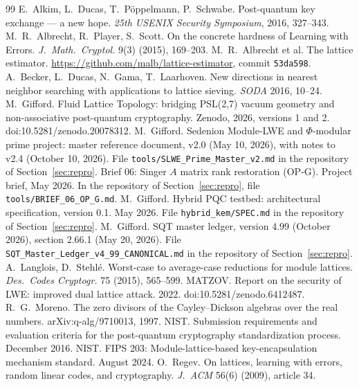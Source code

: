 \documentclass[11pt]{article}
\theoremstyle{remark}
\begin{document}
\begin{thebibliography}{99}\small
{} E.~Alkim, L.~Ducas, T.~P\"oppelmann, P.~Schwabe. Post-quantum key exchange --- a new hope.
  \emph{25th USENIX Security Symposium}, 2016, 327--343.
 M.~R.~Albrecht, R.~Player, S.~Scott. On the concrete hardness of Learning with Errors.
  \emph{J.\ Math.\ Cryptol.} 9(3) (2015), 169--203.
 M.~R.~Albrecht et al. The lattice estimator.
  \url{https://github.com/malb/lattice-estimator}, commit \texttt{53da598}.
 A.~Becker, L.~Ducas, N.~Gama, T.~Laarhoven. New directions in nearest neighbor searching with
  applications to lattice sieving. \emph{SODA} 2016, 10--24.
 M.~Gifford. Fluid Lattice Topology: bridging PSL(2,7) vacuum geometry and non-associative
  post-quantum cryptography. Zenodo, 2026, versions 1 and 2. doi:10.5281/zenodo.20078312.
 M.~Gifford. Sedenion Module-LWE and $\Phi$-modular prime project: master reference document, v2.0
  (May 10, 2026), with notes to v2.4 (October 10, 2026). File \texttt{tools/SLWE\_Prime\_Master\_v2.md} in the
  repository of Section~\ref{sec:repro}.
 Brief 06: Singer $A$ matrix rank restoration (OP-G). Project brief, May 2026. In the repository of
  Section~\ref{sec:repro}, file \texttt{tools/BRIEF\_06\_OP\_G.md}.
 M.~Gifford. Hybrid PQC testbed: architectural specification, version 0.1. May 2026. File
  \texttt{hybrid\_kem/SPEC.md} in the repository of Section~\ref{sec:repro}.
 M.~Gifford. SQT master ledger, version 4.99 (October 2026), section 2.66.1 (May 20, 2026). File
  \texttt{SQT\_Master\_Ledger\_v4\_99\_CANONICAL.md} in the repository of Section~\ref{sec:repro}.
 A.~Langlois, D.~Stehl\'e. Worst-case to average-case reductions for module lattices.
  \emph{Des.\ Codes Cryptogr.} 75 (2015), 565--599.
 MATZOV. Report on the security of LWE: improved dual lattice attack. 2022.
  doi:10.5281/zenodo.6412487.
 R.~G.~Moreno. The zero divisors of the Cayley--Dickson algebras over the real numbers.
  arXiv:q-alg/9710013, 1997.
 NIST. Submission requirements and evaluation criteria for the post-quantum cryptography
  standardization process. December 2016.
 NIST. FIPS 203: Module-lattice-based key-encapsulation mechanism standard. August 2024.
 O.~Regev. On lattices, learning with errors, random linear codes, and cryptography.
  \emph{J.\ ACM} 56(6) (2009), article 34.
\end{thebibliography}
\end{document}
